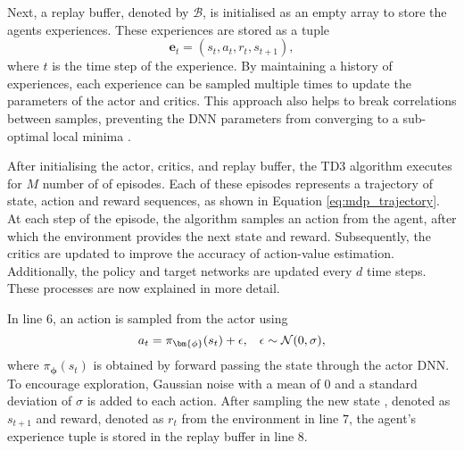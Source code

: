 Next, a replay buffer, denoted by $\mathcal{B}$, is initialised as an empty array to store the agents experiences.
These experiences are stored as a tuple 
\begin{equation}
    \bm{e}_t = (s_t,a_t,r_t,s_{t+1}),
\end{equation}
where $t$ is the time step of the experience.
By maintaining a history of experiences, each experience can be sampled multiple times to update the parameters of the actor and critics.
This approach also helps to break correlations between samples, preventing the DNN parameters from converging to a sub-optimal local minima \cite{mnih2013}.


After initialising the actor, critics, and replay buffer, the TD3 algorithm executes for $M$ number of of episodes.
Each of these episodes represents a trajectory of state, action and reward sequences, as shown in Equation \ref{eq:mdp_trajectory}.
At each step of the episode, the algorithm samples an action from the agent, after which the environment provides the next state and reward.
Subsequently, the critics are updated to improve the accuracy of action-value estimation.
Additionally, the policy and target networks are updated every $d$ time steps.
These processes are now explained in more detail.


In line $6$, an action is sampled from the actor using
\begin{equation}\label{eq:dpg_policy}
    a_t = \pi_{\bm{\phi}}(s_t) + \epsilon, \hspace{0.3cm} \epsilon \sim \mathcal{N}(0,\sigma),
\end{equation}
where $ \pi_{\bm{\phi}}(s_t)$ is obtained by forward passing the state through the actor DNN.
To encourage exploration, Gaussian noise with a mean of $0$ and a standard deviation of $\sigma$ is added to each action.
After sampling the new state , denoted as $s_{t+1}$ and reward, denoted as $r_{t}$ from the environment in line $7$, the agent's experience tuple is stored in the replay buffer in line $8$.



